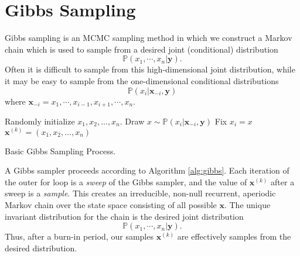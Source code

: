 
\section*{Gibbs Sampling}
Gibbs sampling is an MCMC sampling method in which we construct a Markov chain which is used to sample from a desired joint (conditional) distribution
\begin{equation*}
\mathbb{P}(x_{1},\cdots,x_{n} | \mathbf{y}).
\end{equation*}
Often it is difficult to sample from this high-dimensional joint distribution, while it may be easy to sample from the one-dimensional
conditional distributions
\begin{equation*}
\mathbb{P}(x_{i} | \mathbf{x}_{-i}, \mathbf{y})
\end{equation*}
where $\mathbf{x}_{-i} = x_{1},\cdots,x_{i-1},x_{i+1},\cdots,x_{n}.$

\begin{algorithm}
\begin{algorithmic}[1]
    \State \textrm{Randomly initialize } $x_1,x_2,\ldots,x_n$.
            \State \textrm{Draw } $x \sim \mathbb{P}(x_{i} | \mathbf{x}_{-i}, \mathbf{y})$
            \State \textrm{Fix } $x_i = x$
        \EndFor
        \State $\mathbf{x}^{(k)}= (x_1,x_2,\ldots,x_n)$
    \EndFor
\EndProcedure
\end{algorithmic}
\caption{Basic Gibbs Sampling Process.}
\label{alg:gibbs}
\end{algorithm}
A Gibbs sampler proceeds according to Algorithm \ref{alg:gibbs}.
Each iteration of the outer for loop is a \emph{sweep} of the Gibbs sampler, and the value of $\mathbf{x}^{(k)}$ after a sweep is a \emph{sample}. This creates an irreducible, non-null recurrent, aperiodic Markov chain over the state space consisting of all possible $\mathbf{x}$. The unique invariant distribution for the chain is the desired joint distribution
\begin{equation*}
\mathbb{P}(x_{1},\cdots,x_{n} | \mathbf{y}).
\end{equation*}
Thus, after a burn-in period, our samples $\mathbf{x}^{(k)}$ are effectively samples from the desired distribution.

